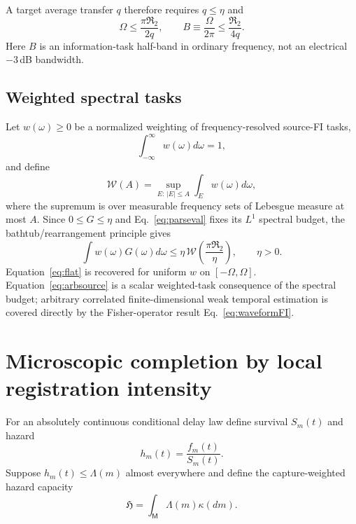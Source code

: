\documentclass[aps,prapplied,preprint,nofootinbib]{revtex4-2}
\newcommand{\Wcal}{\mathcal W}
\newcommand{\Rtwo}{\mathfrak R_2}
\newcommand{\Hcap}{\mathfrak H}
\newcommand{\M}{\mathsf M}
\begin{document}
A target average transfer $q$ therefore requires $q\le\eta$ and
\begin{equation}
\Omega\le\frac{\pi\Rtwo}{2q},
\qquad
B\equiv\frac{\Omega}{2\pi}\le\frac{\Rtwo}{4q}.
\end{equation}
Here $B$ is an information-task half-band in ordinary frequency, not an electrical $-3\,$dB bandwidth.

\subsection{Weighted spectral tasks}

Let $w(\omega)\ge0$ be a normalized weighting of frequency-resolved source-FI tasks,
\begin{equation}
\int_{-\infty}^{\infty}w(\omega)d\omega=1,
\end{equation}
and define
\begin{equation}
\Wcal(A)=\sup_{E:\,|E|\le A}\int_Ew(\omega)d\omega,
\label{eq:W}
\end{equation}
where the supremum is over measurable frequency sets of Lebesgue measure at most $A$. Since $0\le G\le\eta$ and Eq.~\eqref{eq:parseval} fixes its $L^1$ spectral budget, the bathtub/rearrangement principle gives
\begin{equation}
\boxed{
\int w(\omega)G(\omega)d\omega
\le\eta\,\Wcal\!\left(\frac{\pi\Rtwo}{\eta}\right),\qquad \eta>0.}
\label{eq:arbsource}
\end{equation}
Equation~\eqref{eq:flat} is recovered for uniform $w$ on $[-\Omega,\Omega]$. Equation~\eqref{eq:arbsource} is a scalar weighted-task consequence of the spectral budget; arbitrary correlated finite-dimensional weak temporal estimation is covered directly by the Fisher-operator result Eq.~\eqref{eq:waveformFI}.

\section{Microscopic completion by local registration intensity}

For an absolutely continuous conditional delay law define survival $S_m(t)$ and hazard
\begin{equation}
h_m(t)=\frac{f_m(t)}{S_m(t)}.
\end{equation}
Suppose $h_m(t)\le\Lambda(m)$ almost everywhere and define the capture-weighted hazard capacity
\begin{equation}
\boxed{\Hcap=\int_{\M}\Lambda(m)\kappa(dm).}
\label{eq:Hcap}
\end{equation}
\end{document}
